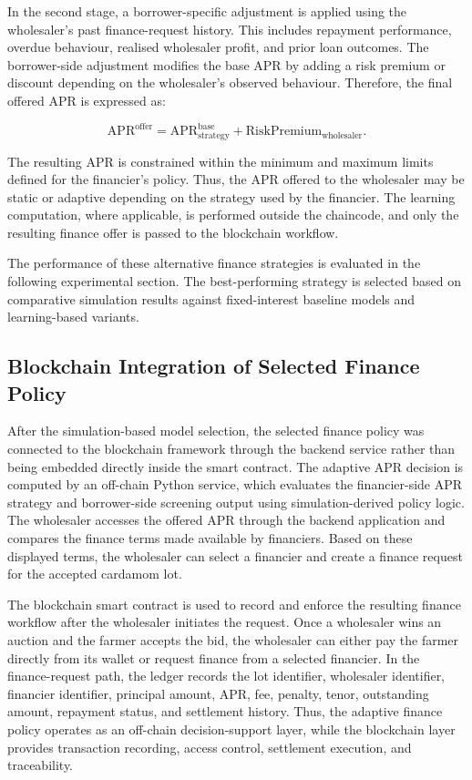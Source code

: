 \documentclass[12pt]{article}
\begin{document}
	In the second stage, a borrower-specific adjustment is applied using the wholesaler's past finance-request history. This includes repayment performance, overdue behaviour, realised wholesaler profit, and prior loan outcomes. The borrower-side adjustment modifies the base APR by adding a risk premium or discount depending on the wholesaler's observed behaviour. Therefore, the final offered APR is expressed as:
	
	\[
	\mathrm{APR}^{\mathrm{offer}}
	=
	\mathrm{APR}^{\mathrm{base}}_{\mathrm{strategy}}
	+
	\mathrm{RiskPremium}_{\mathrm{wholesaler}}.
	\]
	
	The resulting APR is constrained within the minimum and maximum limits defined for the financier's policy. Thus, the APR offered to the wholesaler may be static or adaptive depending on the strategy used by the financier. The learning computation, where applicable, is performed outside the chaincode, and only the resulting finance offer is passed to the blockchain workflow.
	
	The performance of these alternative finance strategies is evaluated in the following experimental section. The best-performing strategy is selected based on comparative simulation results against fixed-interest baseline models and learning-based variants.

	
\subsection{Blockchain Integration of Selected Finance Policy}

After the simulation-based model selection, the selected finance policy was connected to the blockchain framework through the backend service rather than being embedded directly inside the smart contract. The adaptive APR decision is computed by an off-chain Python service, which evaluates the financier-side APR strategy and borrower-side screening output using simulation-derived policy logic. The wholesaler accesses the offered APR through the backend application and compares the finance terms made available by financiers. Based on these displayed terms, the wholesaler can select a financier and create a finance request for the accepted cardamom lot.

The blockchain smart contract is used to record and enforce the resulting finance workflow after the wholesaler initiates the request. Once a wholesaler wins an auction and the farmer accepts the bid, the wholesaler can either pay the farmer directly from its wallet or request finance from a selected financier. In the finance-request path, the ledger records the lot identifier, wholesaler identifier, financier identifier, principal amount, APR, fee, penalty, tenor, outstanding amount, repayment status, and settlement history. Thus, the adaptive finance policy operates as an off-chain decision-support layer, while the blockchain layer provides transaction recording, access control, settlement execution, and traceability.
\end{document}
